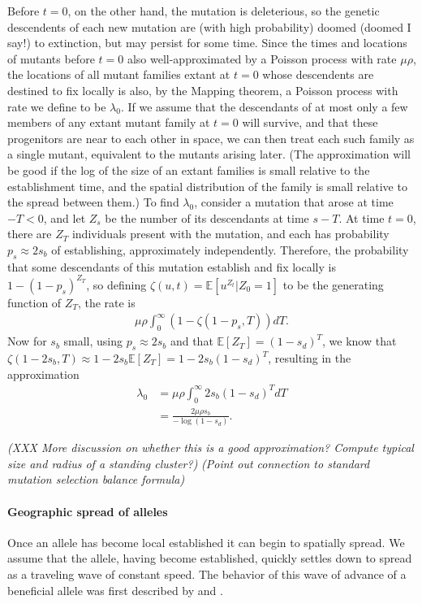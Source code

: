 \documentclass{article}
\newcommand{\gc}[1]{{\it\color{green}(#1)} }
\newcommand{\plr}[1]{{\it\color{blue}(#1)}}
\newcommand{\E}{\mathbb{E}}
\begin{document}
Before $t=0$, on the other hand, the mutation is deleterious, so the
genetic descendents of each new mutation are (with high probability)
doomed (doomed I say!) to extinction,
but may persist for some time.
Since the times and locations of mutants before $t=0$ also well-approximated by a Poisson process with rate $\mu \rho$,
the locations of all mutant families extant at $t=0$ whose descendents are destined to fix locally is also,
by the Mapping theorem, a Poisson process with rate we define to be $\lambda_0$.
If we assume that the descendants of at most only a few members of any extant mutant family at $t=0$ will survive,
and that these progenitors are near to each other in space, we can then treat each such family as a single mutant,
equivalent to the mutants arising later.
(The approximation will be good if the log of the size of an extant families is small relative to the establishment time,
and the spatial distribution of the family is small relative to the spread between them.)
To find $\lambda_0$, consider a mutation that arose at time $-T<0$, and let $Z_s$ be the number of its descendants at time $s-T$.
At time $t=0$, there are $Z_T$ individuals present with the mutation,
and each has probability $p_s \approx 2s_b$ of establishing, approximately independently.
Therefore, the probability that some descendants of this mutation establish and fix locally is $1-(1-p_s)^{Z_T}$,
so defining $\zeta(u,t) = \E[u^{Z_t} | Z_0=1 ]$ to be the generating function of $Z_T$,
the rate is
\begin{align*}
    \mu \rho \int_0^\infty \left( 1- \zeta(1-p_s,T) \right) dT .
\end{align*}
Now for $s_b$ small, using $p_s \approx 2s_b$ and that $\E[Z_T]=(1-s_d)^T$,
we know that $\zeta(1-2s_b,T) \approx 1-2s_b \E[Z_T] = 1-2s_b (1-s_d)^T$,
resulting in the approximation
\begin{align}
    \lambda_0 &= \mu \rho \int_0^\infty 2s_b (1-s_d)^{T} dT \\
        &= \frac{ 2 \mu \rho s_b }{ -\log(1-s_d) } .
\end{align}


\plr{XXX More discussion on whether this is a good approximation?  
Compute typical size and radius of a standing cluster?}
\gc{Point out connection to standard mutation selection balance formula}


\paragraph{Geographic spread of alleles} 
Once an allele has become local established it can begin to spatially spread. 
We assume that the allele, having become established, quickly settles
down to spread as a traveling wave of constant speed. The behavior of
this wave of advance of a beneficial allele was first described by 
\citet{fisher1937wave} and \citet*{KPP1937}. 
\end{document}
